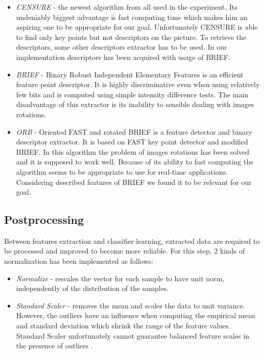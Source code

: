 \documentclass[11pt,a4paper]{article}
\begin{document}
\begin{itemize}
	\item \textit{CENSURE}\cite{CENSURE} - the newest algorithm from all used in the experiment. Its undeniably biggest advantage is fast computing time which makes him an aspiring one to be appropriate for our goal. Unfortunately CENSURE is able to find only key points but not descriptors on the picture. To retrieve the descriptors, some other descriptors extractor has to be used. In our implementation descriptors has been acquired with usage of BRIEF. 
	
	\item \textit{BRIEF} - Binary Robust Independent Elementary Features is an efficient feature point descriptor. It is highly discriminative even when using relatively few bits and is computed using simple intensity difference tests\cite{BRIEF}. The main disadvantage of this extractor is its inability to sensible dealing with images rotations.
	
	\item \textit{ORB} - Oriented FAST\cite{FAST} and rotated BRIEF is a feature detector and binary descriptor extractor. It is based on FAST key point detector and modified BRIEF.\cite{ORB} In this algorithm the problem of images rotations has been solved and it is supposed to work well. Because of its ability to fast computing the algorithm seems to be appropriate to use for real-time applications. Considering described features of BRIEF we found it to be relevant for our goal.
\end{itemize}

\subsection{Postprocessing}

Between features extraction and classifier learning, extracted data are required to be processed and improved to become more reliable. For this step, 2 kinds of normalization has been implemented as follows:

\begin{itemize}
	\item \textit{Normalize}  - rescales the vector for each sample to have unit norm, independently of the distribution of the samples\cite{PREPROCESSING}.
	
	\item \textit{Standard Scaler}  - removes the mean and scales the data to unit variance. However, the outliers have an influence when computing the empirical mean and standard deviation which shrink the range of the feature values. Standard Scaler unfortunately cannot guarantee balanced feature scales in the presence of outliers \cite{PREPROCESSING}.
\end{itemize}
\end{document}
